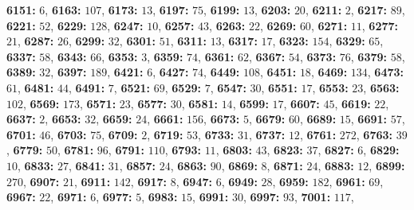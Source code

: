 \textsf{\bfseries 6151:} $6$, \textsf{\bfseries 6163:} $107$, \textsf{\bfseries 6173:} $13$, \textsf{\bfseries 6197:} $75$, \textsf{\bfseries 6199:} $13$, \textsf{\bfseries 6203:} $20$, \textsf{\bfseries 6211:} $2$, \textsf{\bfseries 6217:} $89$, \textsf{\bfseries 6221:} $52$, \textsf{\bfseries 6229:} $128$, \textsf{\bfseries 6247:} $10$, \textsf{\bfseries 6257:} $43$, \textsf{\bfseries 6263:} $22$, \textsf{\bfseries 6269:} $60$, \textsf{\bfseries 6271:} $11$, \textsf{\bfseries 6277:} $21$, \textsf{\bfseries 6287:} $26$, \textsf{\bfseries 6299:} $32$, \textsf{\bfseries 6301:} $51$, \textsf{\bfseries 6311:} $13$, \textsf{\bfseries 6317:} $17$, \textsf{\bfseries 6323:} $154$, \textsf{\bfseries 6329:} $65$, \textsf{\bfseries 6337:} $58$, \textsf{\bfseries 6343:} $66$, \textsf{\bfseries 6353:} $3$, \textsf{\bfseries 6359:} $74$, \textsf{\bfseries 6361:} $62$, \textsf{\bfseries 6367:} $54$, \textsf{\bfseries 6373:} $76$, \textsf{\bfseries 6379:} $58$, \textsf{\bfseries 6389:} $32$, \textsf{\bfseries 6397:} $189$, \textsf{\bfseries 6421:} $6$, \textsf{\bfseries 6427:} $74$, \textsf{\bfseries 6449:} $108$, \textsf{\bfseries 6451:} $18$, \textsf{\bfseries 6469:} $134$, \textsf{\bfseries 6473:} $61$, \textsf{\bfseries 6481:} $44$, \textsf{\bfseries 6491:} $7$, \textsf{\bfseries 6521:} $69$, \textsf{\bfseries 6529:} $7$, \textsf{\bfseries 6547:} $30$, \textsf{\bfseries 6551:} $17$, \textsf{\bfseries 6553:} $23$, \textsf{\bfseries 6563:} $102$, \textsf{\bfseries 6569:} $173$, \textsf{\bfseries 6571:} $23$, \textsf{\bfseries 6577:} $30$, \textsf{\bfseries 6581:} $14$, \textsf{\bfseries 6599:} $17$, \textsf{\bfseries 6607:} $45$, \textsf{\bfseries 6619:} $22$, \textsf{\bfseries 6637:} $2$, \textsf{\bfseries 6653:} $32$, \textsf{\bfseries 6659:} $24$, \textsf{\bfseries 6661:} $156$, \textsf{\bfseries 6673:} $5$, \textsf{\bfseries 6679:} $60$, \textsf{\bfseries 6689:} $15$, \textsf{\bfseries 6691:} $57$, \textsf{\bfseries 6701:} $46$, \textsf{\bfseries 6703:} $75$, \textsf{\bfseries 6709:} $2$, \textsf{\bfseries 6719:} $53$, \textsf{\bfseries 6733:} $31$, \textsf{\bfseries 6737:} $12$, \textsf{\bfseries 6761:} $272$, \textsf{\bfseries 6763:} $39$, \textsf{\bfseries 6779:} $50$, \textsf{\bfseries 6781:} $96$, \textsf{\bfseries 6791:} $110$, \textsf{\bfseries 6793:} $11$, \textsf{\bfseries 6803:} $43$, \textsf{\bfseries 6823:} $37$, \textsf{\bfseries 6827:} $6$, \textsf{\bfseries 6829:} $10$, \textsf{\bfseries 6833:} $27$, \textsf{\bfseries 6841:} $31$, \textsf{\bfseries 6857:} $24$, \textsf{\bfseries 6863:} $90$, \textsf{\bfseries 6869:} $8$, \textsf{\bfseries 6871:} $24$, \textsf{\bfseries 6883:} $12$, \textsf{\bfseries 6899:} $270$, \textsf{\bfseries 6907:} $21$, \textsf{\bfseries 6911:} $142$, \textsf{\bfseries 6917:} $8$, \textsf{\bfseries 6947:} $6$, \textsf{\bfseries 6949:} $28$, \textsf{\bfseries 6959:} $182$, \textsf{\bfseries 6961:} $69$, \textsf{\bfseries 6967:} $22$, \textsf{\bfseries 6971:} $6$, \textsf{\bfseries 6977:} $5$, \textsf{\bfseries 6983:} $15$, \textsf{\bfseries 6991:} $30$, \textsf{\bfseries 6997:} $93$, \textsf{\bfseries 7001:} $117$, 
